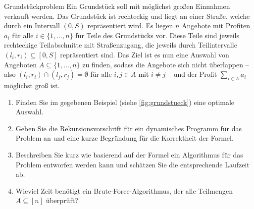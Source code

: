 \documentclass{article}
\begin{document}
\begin{exercise}{Grundstückproblem}
  Ein Grundstück soll mit möglichst großen Einnahmen verkauft werden. Das Grundstück ist rechteckig und liegt an einer Straße, welche durch ein Intervall $(0, S)$ repräsentiert wird. Es liegen $n$ Angebote mit Profiten $a_i$ für alle $i \in \{1, \ldots, n\}$ für Teile des Grundstücks vor. Diese Teile sind jeweils rechteckige Teilabschnitte mit Straßenzugang, die jeweils durch Teilintervalle $(l_i, r_i) \subseteq [0, S]$ repräsentiert sind. Das Ziel ist es nun eine Auswahl von Angeboten $A \subseteq \{1, \ldots, n\}$ zu finden, sodass die Angebote sich nicht überlappen – also $(l_i, r_i) \cap (l_j, r_j)=\emptyset$ für alle $i,j \in A$ mit $i \neq j$ – und der Profit $\sum_{i \in A} a_i$ möglichst groß ist.
  
  \begin{enumerate}
    \item Finden Sie im gegebenen Beispiel (siehe \ref{fig:grundstueck}) eine optimale Auswahl.
    \item Geben Sie die Rekursionsvorschrift für ein dynamisches Programm für das Problem an und eine kurze Begründung für die Korrektheit der Formel.
    \item Beschreiben Sie kurz wie basierend auf der Formel ein Algorithmus für das Problem entworfen werden kann und schätzen Sie die entsprechende Laufzeit ab.
    \item Wieviel Zeit benötigt ein Brute-Force-Algorithmus, der alle Teilmengen $A \subseteq [n]$ überprüft?
  \end{enumerate}


\end{exercise}
\end{document}
